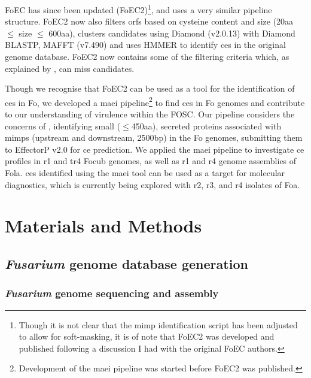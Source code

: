 FoEC has since been updated \parencite{FoEC2} (FoEC2)\footnote{Though it is not clear that the \ac{mimp} identification script has been adjusted to allow for soft-masking, it is of note that FoEC2 was developed and published following a discussion I had with the original FoEC authors.}, and uses a very similar pipeline structure. FoEC2 now also filters \acp{orf} based on cysteine content and size (20aa $\leq$ size $\leq$ 600aa), clusters candidates using Diamond (v2.0.13) with Diamond BLASTP, MAFFT (v7.490) \parencite{Katoh2019} and uses HMMER \parencite{Eddy2011} to identify \acp{ce} in the original genome database. FoEC2 now contains some of the filtering criteria which, as explained by \textcite{Sperschneider2015, LoPresti2015, Todd2022}, can miss candidates. 

Though we recognise that FoEC2 can be used as a tool for the identification of \acp{ce} in \ac{Fo}, we developed a \ac{maei} pipeline\footnote{Development of the \ac{maei} pipeline was started before FoEC2 was published.} to find \acp{ce} in \ac{Fo} genomes and contribute to our understanding of virulence within the \ac{FOSC}. Our pipeline considers the concerns of \textcite{Sperschneider2015, LoPresti2015, Todd2022}, identifying small ($\leq$450aa), secreted proteins associated with \acp{mimp} (upstream and downstream, 2500bp) in the \ac{Fo} genomes, submitting them to EffectorP v2.0 for \ac{ce} prediction. We applied the \ac{maei} pipeline to investigate \ac{ce} profiles in \ac{r1} and \ac{tr4} \ac{Focub} genomes, as well as \ac{r1} and \ac{r4} genome assemblies of \acf{Fola}. \acp{ce} identified using the \ac{maei} tool can be used as a target for molecular diagnostics, which is currently being explored with \ac{r2}, \ac{r3}, and \ac{r4} isolates of \acf{Foa}. 

\newpage
\section{Materials and Methods}

\subsection{\textit{Fusarium} genome database generation}\label{chap3:fusariumdb}

\subsubsection{\textit{Fusarium} genome sequencing and assembly}

